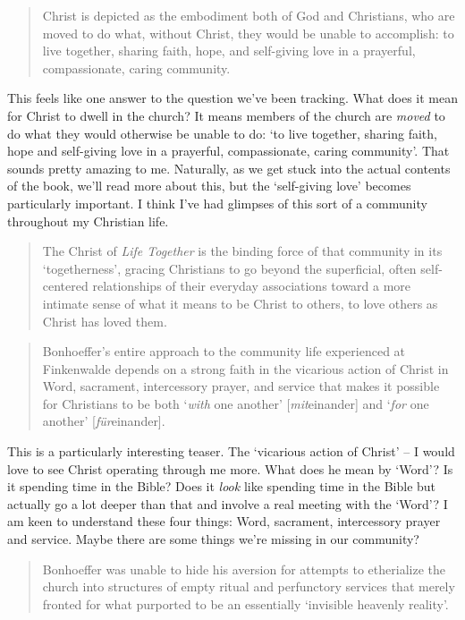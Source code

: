 \begin{quote}
    Christ is depicted as the embodiment both of God and Christians, who are
    moved to do what, without Christ, they would be unable to accomplish: to
    live together, sharing faith, hope, and self-giving love in a prayerful,
    compassionate, caring community.
\end{quote}

This feels like one answer to the question we've been tracking. What does it
mean for Christ to dwell in the church? It means members of the church are
\textit{moved} to do what they would otherwise be unable to do: `to live
together, sharing faith, hope and self-giving love in a prayerful,
compassionate, caring community'. That sounds pretty amazing to me. Naturally,
as we get stuck into the actual contents of the book, we'll read more about
this, but the `self-giving love' becomes particularly important. I think I've
had glimpses of this sort of a community throughout my Christian life.

\begin{quote}
    The Christ of \textit{Life Together} is the binding force of that community
    in its `togetherness', gracing Christians to go beyond the superficial,
    often self-centered relationships of their everyday associations toward a
    more intimate sense of what it means to be Christ to others, to love others
    as Christ has loved them.
\end{quote}

\begin{quote}
    Bonhoeffer's entire approach to the community life experienced at
    Finkenwalde depends on a strong faith in the vicarious action of Christ in
    Word, sacrament, intercessory prayer, and service that makes it possible for
    Christians to be both `\emph{with} one another' [\emph{mit}einander] and
    `\emph{for} one another' [\emph{f\"ur}einander].
\end{quote}

This is a particularly interesting teaser. The `vicarious action of Christ' -- I
would love to see Christ operating through me more. What does he mean by `Word'?
Is it spending time in the Bible? Does it \emph{look} like spending time in the
Bible but actually go a lot deeper than that and involve a real meeting with the
`Word'? I am keen to understand these four things: Word, sacrament, intercessory
prayer and service. Maybe there are some things we're missing in our community?

\begin{quote}
    Bonhoeffer was unable to hide his aversion for attempts to etherialize the
    church into structures of empty ritual and perfunctory services that merely
    fronted for what purported to be an essentially `invisible heavenly
    reality'.
\end{quote}

